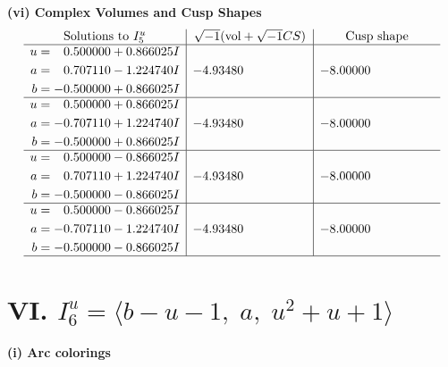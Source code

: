 \documentclass[1p]{elsarticle_modified}
\theoremstyle{definition}
\newcommand{\I}{\sqrt{-1}}
\begin{document}
\newpage\flushleft \textbf{(vi) Complex Volumes and Cusp Shapes}
$$\begin{array}{c|c|c}  
\text{Solutions to }I^u_{5}& \I (\text{vol} + \sqrt{-1}CS) & \text{Cusp shape}\\
 \hline 
\begin{aligned}
u &= \phantom{-}0.500000 + 0.866025 I \\
a &= \phantom{-}0.707110 - 1.224740 I \\
b &= -0.500000 + 0.866025 I\end{aligned}
 & -4.93480\phantom{ +0.000000I} & -8.00000\phantom{ +0.000000I} \\ \hline\begin{aligned}
u &= \phantom{-}0.500000 + 0.866025 I \\
a &= -0.707110 + 1.224740 I \\
b &= -0.500000 + 0.866025 I\end{aligned}
 & -4.93480\phantom{ +0.000000I} & -8.00000\phantom{ +0.000000I} \\ \hline\begin{aligned}
u &= \phantom{-}0.500000 - 0.866025 I \\
a &= \phantom{-}0.707110 + 1.224740 I \\
b &= -0.500000 - 0.866025 I\end{aligned}
 & -4.93480\phantom{ +0.000000I} & -8.00000\phantom{ +0.000000I} \\ \hline\begin{aligned}
u &= \phantom{-}0.500000 - 0.866025 I \\
a &= -0.707110 - 1.224740 I \\
b &= -0.500000 - 0.866025 I\end{aligned}
 & -4.93480\phantom{ +0.000000I} & -8.00000\phantom{ +0.000000I}\\
 \hline 
 \end{array}$$\newpage\newpage\renewcommand{\arraystretch}{1}
\centering \section*{VI. $I^u_{6}= \langle b- u-1,\;a,\;u^2+u+1 \rangle$}
\flushleft \textbf{(i) Arc colorings}\\
\end{document}
